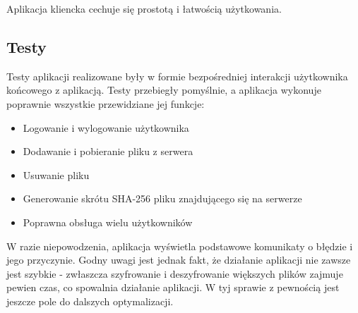 \documentclass{article}
\begin{document}
	Aplikacja kliencka cechuje się prostotą i łatwością użytkowania. 
	
	\subsection{Testy}
	Testy aplikacji realizowane były w formie bezpośredniej interakcji użytkownika końcowego z aplikacją. Testy przebiegły pomyślnie, a aplikacja wykonuje poprawnie wszystkie przewidziane jej funkcje:
	\begin{itemize}
		\item Logowanie i wylogowanie użytkownika
		\item Dodawanie i pobieranie pliku z serwera
		\item Usuwanie pliku
		\item Generowanie skrótu SHA-256 pliku znajdującego się na serwerze
		\item Poprawna obsługa wielu użytkowników
	\end{itemize}

	W razie niepowodzenia, aplikacja wyświetla podstawowe komunikaty o błędzie i jego przyczynie. Godny uwagi jest jednak fakt, że działanie aplikacji nie zawsze jest szybkie - zwłaszcza szyfrowanie i deszyfrowanie większych plików zajmuje pewien czas, co spowalnia działanie aplikacji. W tyj sprawie z pewnością jest jeszcze pole do dalszych optymalizacji. 
	
	
	

	
\end{document}
